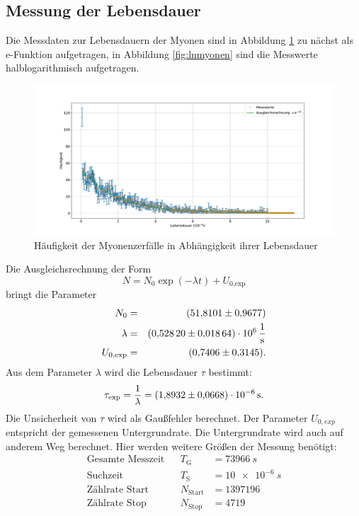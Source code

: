 \subsection{Messung der Lebensdauer}
Die Messdaten zur Lebensdauern der Myonen sind in Abbildung \ref{fig:myonen} zu nächst als e-Funktion aufgetragen, in Abbildung \ref{fig:lnmyonen} sind die Messwerte halblogarithmisch aufgetragen.
\begin{figure}[h!]
  \centering
  \includegraphics[width=\textwidth]{figmyonen.pdf}
  \caption{Häufigkeit der Myonenzerfälle in Abhängigkeit ihrer Lebensdauer}
  \label{fig:myonen}
\end{figure}
Die Ausgleichsrechnung der Form
\begin{equation*}
  N = N_{0} \exp{(- \lambda t)}+U_{\text{0,exp}}
\end{equation*}
bringt die Parameter
\begin{align*}
  N_{0}              &=&  \SI{51.8101 \pm 0.9677}{}\\
  \lambda            &=&  \SI{0.5282 \pm 0.01864 e06}{\frac{1}{s}}\\
  U_{\text{0,exp}}   &=&  \SI{0.7406 \pm 0.3145}{}.\\
\end{align*}
Aus dem Parameter $\lambda$ wird die Lebensdauer $\tau$ bestimmt:
\begin{equation*}
  \tau_{\text{exp}}=\frac{1}{\lambda}=\SI{1.8932 \pm 0.0668 e-06}{s}.
\end{equation*}
Die Unsicherheit von $\tau$ wird als Gaußfehler berechnet.
Der Parameter $U_{0,exp}$ entspricht der gemessenen Untergrundrate.
Die Untergrundrate wird auch auf anderem Weg berechnet.
Hier werden weitere Größen der Messung benötigt:
\begin{align*}
  \text{Gesamte Messzeit}  && T_{\text{G}}      &=\SI{73966}{s} \\
  \text{Suchzeit}          && T_{\text{S}}      &=\SI{10e-6}{s} \\
  \text{Zählrate Start}    && N_{\text{Start}}  &=\SI{1397196}{} \\
  \text{Zählrate Stop}     && N_{\text{Stop}}   &=\SI{4719}{} \\
\end{align*}
